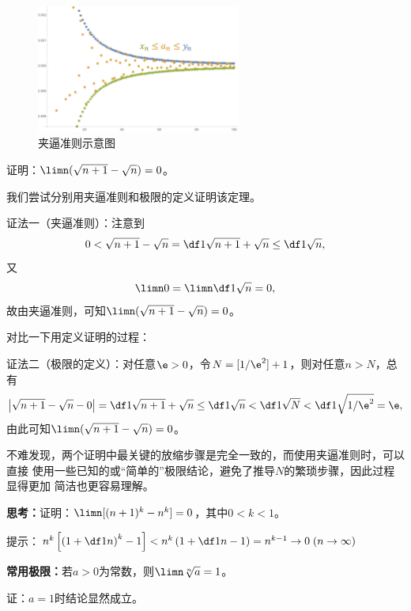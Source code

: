 \begin{figure}[h]
	\centering
	\includegraphics[width=0.6\textwidth]{./Images/Ch01/xnanyn.pdf}
	\caption{夹逼准则示意图}
	\label{fig:xnanyn}
\end{figure}

\bs

\egz 证明：$\limn (\sqrt{n+1}-\sqrt{n})=0$。

我们尝试分别用夹逼准则和极限的定义证明该定理。

证法一（夹逼准则）：注意到
$$0<\sqrt{n+1}-\sqrt{n}={\df1{\sqrt{n+1}+\sqrt{n}}
\leq\df 1{\sqrt{n}}},$$
又
$$\limn 0=\limn\df 1{\sqrt{n}}=0,$$
故由夹逼准则，可知$\limn (\sqrt{n+1}-\sqrt{n})=0$。\fin

对比一下用定义证明的过程：

证法二（极限的定义）：对任意$\e>0$，令$N=[1/\e^2]+1$，则对任意$n>N$，总有
$$\left|\sqrt{n+1}-\sqrt{n}-0\right|
={\df1{\sqrt{n+1}+\sqrt{n}}\leq\df 1{\sqrt{n}}}
<\df 1{\sqrt{N}}<\df 1{\sqrt{1/\e^2}}=\e,$$
由此可知$\limn (\sqrt{n+1}-\sqrt{n})=0$。\fin

不难发现，两个证明中最关键的放缩步骤是完全一致的，而使用夹逼准则时，可以直接
使用一些已知的或“简单的”极限结论，避免了推导$N$的繁琐步骤，因此过程显得更加
简洁也更容易理解。

\bs
{\bf 思考：}证明：$\limn [(n+1)^k-{n}^k]=0$，其中$0<k<1$。

\ifhint
提示：$n^k\left[\left(1+\df1n\right)^k-1\right]
<n^k\left(1+\df1n-1\right)=n^{k-1}\to 0\;(n\to\infty)$
\fi

\bs
{}
\begin{thx}
	{\bf 常用极限：}若$a>0$为常数，则$\limn \sqrt[n]{a}=1$。
\end{thx}
证：$a=1$时结论显然成立。

